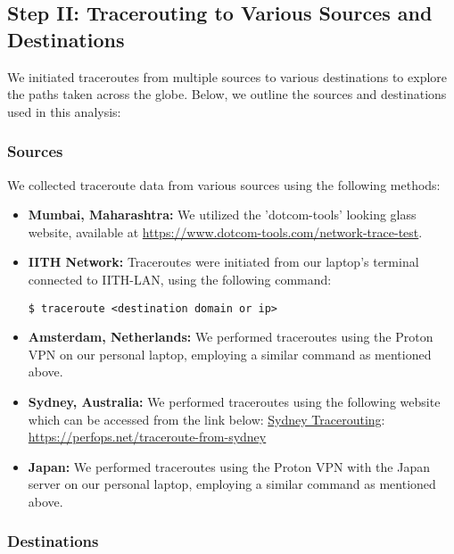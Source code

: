 \documentclass{article}
\begin{document}
\subsection{Step II: Tracerouting to Various Sources and Destinations}
We initiated traceroutes from multiple sources to various destinations to explore the paths taken across the globe. Below, we outline the sources and destinations used in this analysis:

\subsubsection{Sources}

We collected traceroute data from various sources using the following methods:


\begin{itemize}
    \item \textbf{Mumbai, Maharashtra:} We utilized the 'dotcom-tools' looking glass website, available at \href{https://www.dotcom-tools.com/network-trace-test}{https://www.dotcom-tools.com/network-trace-test}.

    \item \textbf{IITH Network:} Traceroutes were initiated from our laptop's terminal connected to IITH-LAN, using the following command:
    
    \begin{verbatim}
$ traceroute <destination domain or ip>
    \end{verbatim}
    
    \item \textbf{Amsterdam, Netherlands:} We performed traceroutes using the Proton VPN on our personal laptop, employing a similar command as mentioned above.
    
    \item \textbf{Sydney, Australia:} We performed traceroutes using the following website which can be accessed from the link below:
\href{https://perfops.net/traceroute-from-sydney}{Sydney Tracerouting}: \\ \url{https://perfops.net/traceroute-from-sydney}

\item \textbf{Japan:} We performed traceroutes using the Proton VPN with the Japan server on our personal laptop, employing a similar command as mentioned above.
    
    
\end{itemize}

\subsubsection{Destinations}
\end{document}
